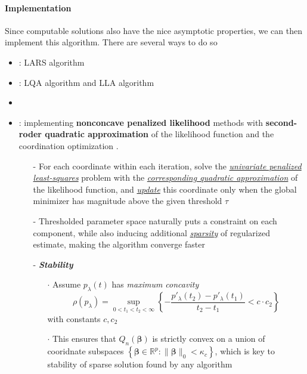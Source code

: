 \documentclass[twoside]{article}
\begin{document}
\paragraph*{Implementation} Since computable solutions also have the nice asymptotic properties, we can then implement this algorithm. There are several ways to do so 
\begin{itemize}
    \item {}: LARS algorithm \citep{efron2004least}
    \item {}: LQA algorithm \citep{fan2001variable} and LLA algorithm \citep{zou2008one}
    \item {} \citep{wu2008coordinate}
    \item {}: implementing \textbf{nonconcave penalized likelihood} methods with \textbf{second-roder quadratic approximation} of the likelihood function and the coordination optimization \citep{fan2011nonconcave}.
    \begin{itemize}
        \item[-] For each coordinate within each iteration, solve the \underline{\textit{univariate penalized least-squares}} problem with the \textit{\underline{corresponding quadratic approximation}} of the likelihood function, and \textit{\underline{update}} this coordinate only when the global minimizer has magnitude above the given threshold $\tau$ 
        \item[-] Thresholded parameter space naturally puts a constraint on each component, while also inducing additional \textit{\underline{sparsity}} of regularized estimate, making the algorithm converge faster
        \item[-] \textbf{\textit{Stability}}
        \begin{itemize}
            \item[$\cdot$] Assume $p_{\lambda}(t)$ has \textit{maximum concavity} $$ \rho(p_{\lambda}) = \sup_{0<t_1<t_2<\infty} \left\{ - \frac{p'_{\lambda}(t_2)-p'_{\lambda}(t_1)}{t_2-t_1} < c\cdot c_2 \right\} $$ with constants $c,c_2$
            \item[$\cdot$] This ensures that $Q_n(\boldsymbol{\beta})$  is strictly convex on a union of cooridnate subspaces $\left\{ \boldsymbol{\beta}\in\mathbb{R}^p: \lVert \boldsymbol{\beta} \rVert _0 < \kappa_c \right\}$, which is key to stability of sparse solution found by any algorithm
        \end{itemize}
    \end{itemize}
\end{itemize}

\newpage


\end{document}
